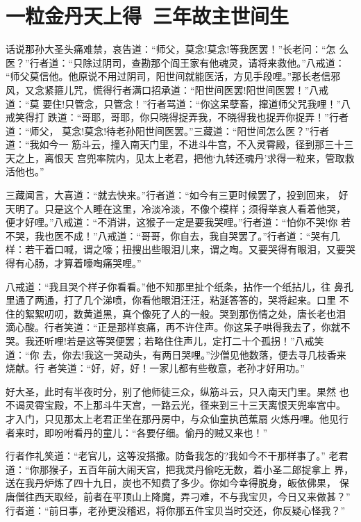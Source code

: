 \chapter{一粒金丹天上得~三年故主世间生}

话说那孙大圣头痛难禁，哀告道：“师父，莫念!莫念!等我医罢！”长老问：“怎
么医？”行者道：“只除过阴司，查勘那个阎王家有他魂灵，请将来救他。”八戒道：
“师父莫信他。他原说不用过阴司，阳世间就能医活，方见手段哩。”那长老信邪
风，又念紧箍儿咒，慌得行者满口招承道：“阳世间医罢!阳世间医罢！”八戒道：“莫
要住!只管念，只管念！”行者骂道：“你这呆孽畜，撺道师父咒我哩！”八戒笑得打
跌道：“哥耶，哥耶，你只晓得捉弄我，不晓得我也捉弄你捉弄！”行者道：“师父，
莫念!莫念!待老孙阳世间医罢。”三藏道：“阳世间怎么医？”行者道：“我如今一
筋斗云，撞入南天门里，不进斗牛宫，不入灵霄殿，径到那三十三天之上，离恨天
宫兜率院内，见太上老君，把他‘九转还魂丹’求得一粒来，管取救活他也。”

三藏闻言，大喜道：“就去快来。”行者道：“如今有三更时候罢了，投到回来，
好天明了。只是这个人睡在这里，冷淡冷淡，不像个模样；须得举哀人看着他哭，
便才好哩。”八戒道：“不消讲，这猴子一定是要我哭哩。”行者道：“怕你不哭!你
若不哭，我也医不成！”八戒道：“哥哥，你自去，我自哭罢了。”行者道：“哭有几
样：若干着口喊，谓之嚎；扭搜出些眼泪儿来，谓之啕。又要哭得有眼泪，又要哭
得有心肠，才算着嚎啕痛哭哩。”

八戒道：“我且哭个样子你看看。”他不知那里扯个纸条，拈作一个纸拈儿，往
鼻孔里通了两通，打了几个涕喷，你看他眼泪汪汪，粘涎答答的，哭将起来。口里
不住的絮絮叨叨，数黄道黑，真个像死了人的一般。哭到那伤情之处，唐长老也泪
滴心酸。行者笑道：“正是那样哀痛，再不许住声。你这呆子哄得我去了，你就不
哭。我还听哩!若是这等哭便罢；若略住住声儿，定打二十个孤拐！”八戒笑道：“你
去，你去!我这一哭动头，有两日哭哩。”沙僧见他数落，便去寻几枝香来烧献。行
者笑道：“好，好，好！一家儿都有些敬意，老孙才好用功。”

好大圣，此时有半夜时分，别了他师徒三众，纵筋斗云，只入南天门里。果然
也不谒灵霄宝殿，不上那斗牛天宫，一路云光，径来到三十三天离恨天兜率宫中。
才入门，只见那太上老君正坐在那丹房中，与众仙童执芭蕉扇火炼丹哩。他见行
者来时，即吩咐看丹的童儿：“各要仔细。偷丹的贼又来也！”

行者作礼笑道：“老官儿，这等没搭撒。防备我怎的?我如今不干那样事了。”
老君道：“你那猴子，五百年前大闹天宫，把我灵丹偷吃无数，着小圣二郎捉拿上
界，送在我丹炉炼了四十九日，炭也不知费了多少。你如今幸得脱身，皈依佛果，
保唐僧往西天取经，前者在平顶山上降魔，弄刁难，不与我宝贝，今日又来做甚？”
行者道：“前日事，老孙更没稽迟，将你那五件宝贝当时交还，你反疑心怪我？”

